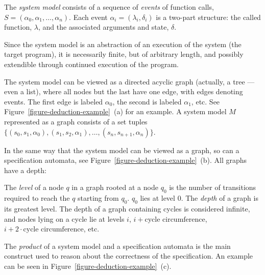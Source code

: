 \begin{mydef}\label{def-system-model}
The \textit{system model} consists of a sequence of \textit{events} of function
calls, $S = (\alpha_0, \alpha_1, \dots, \alpha_n)$. Each event $\alpha_i =
(\lambda_i, \delta_i)$ is a two-part structure: the called function, $\lambda$,
and the associated arguments and state, $\delta$.

Since the system model is an abstraction of an execution of the system (the
target program), it is necessarily finite, but of arbitrary length, and
possibly extendible through continued execution of the program.

The system model can be viewed as a directed acyclic graph (actually, a tree
--- even a list), where all nodes but the last have one edge, with edges
denoting events. The first edge is labeled $\alpha_0$, the second is labeled
$\alpha_1$, etc. See Figure~\ref{figure-deduction-example}~(a) for an example.
A system model $M$ represented as a graph consists of a set tuples
$\{(s_0,s_1,\alpha_0), (s_1,s_2,\alpha_1), \dots, (s_n,s_{n+1},\alpha_n)\}$.
\end{mydef}


In the same way that the system model can be viewed as a graph, so can a
specification automata, see Figure~\ref{figure-deduction-example}~(b). All
graphs have a depth:

\begin{mydef}
The \textit{level} of a node $q$ in a graph rooted at a node $q_0$ is the
number of transitions required to reach the $q$ starting from $q_0$. $q_0$ lies
at level $0$. The \textit{depth} of a graph is its greatest level. The
depth of a graph containing cycles is considered infinite, and nodes lying on a
cycle lie at levels $i$, $i+\text{cycle circumference}$, $i+2\cdot\text{cycle
circumference}$, etc.
\end{mydef}

The \textit{product} of a system model and a specification automata is the main
construct used to reason about the correctness of the specification. An example
can be seen in Figure~\ref{figure-deduction-example}~(c).


